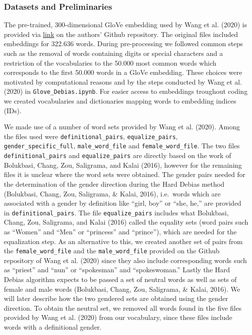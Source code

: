 \documentclass[
  english,
  man,floatsintext]{apa6}
\begin{document}
\hypertarget{datasets-and-preliminaries}{%
\subsubsection{Datasets and Preliminaries}\label{datasets-and-preliminaries}}

The pre-trained, 300-dimensional GloVe embedding used by Wang et al. (2020) is provided via \href{http://www.cs.virginia.edu/~tw8cb/word_embeddings/}{link} on the authors' Github repository. The original files included embeddings for 322.636 words. During pre-processing we followed common steps such as the removal of words containing digits or special characters and a restriction of the vocabularies to the 50.000 most common words which corresponds to the first 50.000 words in a GloVe embedding. These choices were motivated by computational reasons and by the steps conducted by Wang et al. (2020) in \texttt{Glove\_Debias.ipynb}. For easier access to embeddings troughout coding we created vocabularies and dictionaries mapping words to embedding indices (IDs).

We made use of a number of word sets provided by Wang et al. (2020). Among the files used were \texttt{definitional\_pairs}, \texttt{equalize\_pairs}, \texttt{gender\_specific\_full}, \texttt{male\_word\_file} and \texttt{female\_word\_file}. The two files \texttt{definitional\_pairs} and \texttt{equalize\_pairs} are directly based on the work of Bolukbasi, Chang, Zou, Saligrama, and Kalai (2016), however for the remaining files it is unclear where the word sets were obtained. The gender pairs needed for the determination of the gender direction during the Hard Debias method (Bolukbasi, Chang, Zou, Saligrama, \& Kalai, 2016), i.e.~words which are associated with a gender by definition like ``girl, boy'' or ``she, he,'' are provided in \texttt{definitional\_pairs}. The file \texttt{equalize\_pairs} includes what Bolukbasi, Chang, Zou, Saligrama, and Kalai (2016) called the equality sets (word pairs such as ``Women'' and ``Men'' or ``princess'' and ``prince''), which are needed for the equalization step. As an alternative to this, we created another set of pairs from the \texttt{female\_word\_file} and the \texttt{male\_word\_file} provided on the Github repository of Wang et al. (2020) since they also include corresponding words such as ``priest'' and ``nun'' or ``spokesman'' and ``spokeswoman.'' Lastly the Hard Debias algorithm expects to be passed a set of neutral words as well as sets of female and male words (Bolukbasi, Chang, Zou, Saligrama, \& Kalai, 2016). We will later describe how the two gendered sets are obtained using the gender direction. To obtain the neutral set, we removed all words found in the five files provided by Wang et al. (2020) from our vocabulary, since these files include words with a definitional gender.
\end{document}

